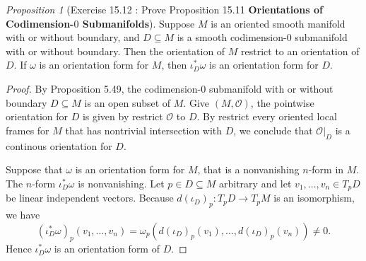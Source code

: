 \documentclass[a4paper]{article}
\theoremstyle{remark}
\newtheorem{prop}{Proposition}
\newcommand{\subhim}{\subseteq} %
\begin{document}
\begin{prop}[Exercise 15.12 : Prove Proposition 15.11 \textbf{Orientations of Codimension-\boldmath$0$ Submanifolds}]
Suppose $M$ is an oriented smooth manifold with or without boundary, and $D \subhim M$ is a smooth codimension-$0$ submanifold with or without boundary. Then the orientation of $M$ restrict to an orientation of $D$. If $\omega$ is an orientation form for $M$, then $\iota^*_D\omega$ is an orientation form for $D$.  
\end{prop}
\begin{proof}
By Proposition 5.49, the codimension-0 submanifold with or without boundary $D \subhim M$ is an open subset of $M$. Give $(M,\mathcal{O})$, the pointwise orientation for $D$ is given by restrict $\mathcal{O}$ to $D$. By restrict every oriented local frames for $M$ that has nontrivial intersection with $D$, we conclude that $\mathcal{O}|_D$ is a continous orientation for $D$.

Suppose that $\omega$ is an orientation form for $M$, that is a nonvanishing $n$-form in $M$. The $n$-form $\iota_D^*\omega$ is nonvanishing. Let $p \in D\subhim M$ arbitrary and let  $v_1,\dots,v_n \in T_pD$ be linear independent vectors. Because $d(\iota_D)_p : T_pD \to T_pM$ is an isomorphism, we have
$$
(\iota_D^*\omega)_p(v_1,\dots,v_n) = \omega_p(d(\iota_D)_p(v_1),\dots,d(\iota_D)_p(v_n)) \neq 0.
$$
Hence $\iota^*_D\omega$ is an orientation form of $D$.

\end{proof}
\end{document}
